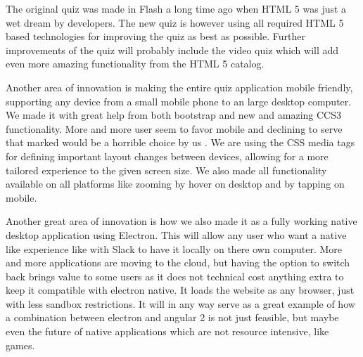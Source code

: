The original quiz was made in Flash a long time ago when HTML 5 was just a wet dream by developers. The new quiz is however using all required HTML 5 based technologies for improving the quiz as best as possible. Further improvements of the quiz will probably include the video quiz which will add even more amazing functionality from the HTML 5 catalog.

Another area of innovation is making the entire quiz application mobile friendly, supporting any device from a small mobile phone to an large desktop computer. We made it with great help from both bootstrap and new and amazing CCS3 functionality. More and more user seem to favor mobile and declining to serve that marked would be a horrible choice by us \cite{Mobil51:online}. We are using the CSS media tags for defining important layout changes between devices, allowing for a more tailored experience to the given screen size. We also made all functionality available on all platforms like zooming by hover on desktop and by tapping on mobile. 

Another great area of innovation is how we also made it as a fully working native desktop application using Electron. This will allow any user who want a native like experience like with Slack to have it locally on there own computer. More and more applications are moving to the cloud, but having the option to switch back brings value to some users as it does not technical cost anything extra to keep it compatible with electron native. It loads the website as any browser, just with less sandbox restrictions. It will in any way serve as a great example of how a combination between electron and angular 2 is not just feasible, but maybe even the future of native applications which are not resource intensive, like games.
 


